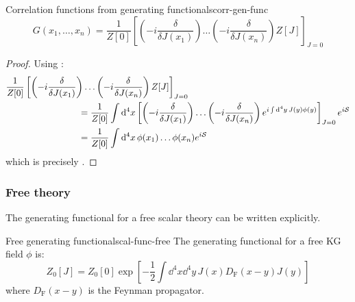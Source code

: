 \begin{lemma}[before upper = {\tcbtitle}]{Correlation functions from generating functionals}{corr-gen-func}
  \begin{equation}
    G(x_1, \dots, x_n) = \frac{1}{Z[0]} \left[ \left( -i \frac{\delta}{\delta J(x_1)} \right) \dots \left( -i \frac{\delta}{\delta J(x_n)} \right) Z[J] \right]_{J = 0}
  \end{equation}
\end{lemma}

\begin{proofbox}
  \begin{proof}
    Using :
    \begin{equation*}
      \begin{split}
        & \frac{1}{Z[0]} \left[ \left( -i \frac{\delta}{\delta J(x_1)} \right) \dots \left( -i \frac{\delta}{\delta J(x_n)} \right) Z[J] \right]_{J = 0} \\
        & \qquad \qquad \qquad \qquad = \frac{1}{Z[0]} \int \mathrm{d}^4x \left[ \left( -i \frac{\delta}{\delta J(x_1)} \right) \dots \left( -i \frac{\delta}{\delta J(x_n)} \right) e^{i \int \mathrm{d}^4y\, J(y) \phi(y)} \right]_{J = 0} e^{i\mathcal{S}} \\
        & \qquad \qquad \qquad \qquad = \frac{1}{Z[0]} \int \mathrm{d}^4x\, \phi(x_1) \dots \phi(x_n) e^{i\mathcal{S}}
      \end{split}
    \end{equation*}
    which is precisely .
  \end{proof}
\end{proofbox}

\subsubsection{Free theory}

The generating functional for a free scalar theory can be written explicitly.

\begin{proposition}{Free generating functional}{scal-func-free}
  The generating functional for a free KG field $ \phi $ is:
  \begin{equation}
    Z_0[J] = Z_0[0] \exp \left[ -\frac{1}{2} \int \dd^4x \dd^4y\, J(x) D_\text{F}(x-y) J(y) \right]
    \label{eq:func-free}
  \end{equation}
  where $ D_\text{F}(x-y) $ is the Feynman propagator.
\end{proposition}


